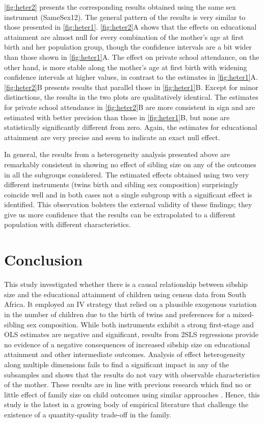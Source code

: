 \autoref{fig:heter2} presents the corresponding results obtained using the same sex instrument (SameSex12). The general pattern of the results is very similar to those presented in \autoref{fig:heter1}. \autoref{fig:heter2}A shows that the effects on educational attainment are almost null for every combination of the mother's age at first birth and her population group, though the confidence intervals are a bit wider than those shown in \autoref{fig:heter1}A. The effect on private school attendance, on the other hand, is more stable along the mother's age at first birth with widening confidence intervals at higher values, in contrast to the estimates in \autoref{fig:heter1}A. \autoref{fig:heter2}B presents results that parallel those in \autoref{fig:heter1}B. Except for minor distinctions, the results in the two plots are qualitatively identical. The estimates for private school attendance in \autoref{fig:heter2}B are more consistent in sign and are estimated with better precision than those in \autoref{fig:heter1}B, but none are statistically significantly different from zero. Again, the estimates for educational attainment are very precise and seem to indicate an exact null effect. 

In general, the results from a heterogeneity analysis presented above are remarkably consistent in showing no effect of sibling size on any of the outcomes in all the subgroups considered. The estimated effects obtained using two very different instruments (twins birth and sibling sex composition) surprisingly coincide well and in both cases not a single subgroup with a significant effect is identified. This observation bolsters the external validity of these findings; they give us more confidence that the results can be extrapolated to a different population with different characteristics. 

\section{Conclusion}
\label{section:conclude}

This study investigated whether there is a causal relationship between sibship size and the educational attainment of children using census data from South Africa. It employed an IV strategy that relied on a plausible exogenous variation in the number of children due to the birth of twins and preferences for a mixed-sibling sex composition. While both instruments exhibit a strong first-stage and OLS estimates are negative and significant, results from 2SLS regressions provide no evidence of a negative consequences of increased sibship size on educational attainment and other intermediate outcomes. Analysis of effect heterogeneity along multiple dimensions fails to find a significant impact in any of the subsamples and shows that the results do not vary with observable characteristics of the mother. These results are in line with previous research which find no or little effect of family size on child outcomes using similar approaches \parencite[e.g.,][]{Black2005,Black2010,caceres-delpiano_impacts_2006,angrist_multiple_2010,bhalotra_twin_2020}. Hence, this study is the latest in a growing body of empirical literature that challenge the existence of a quantity-quality trade-off in the family.


